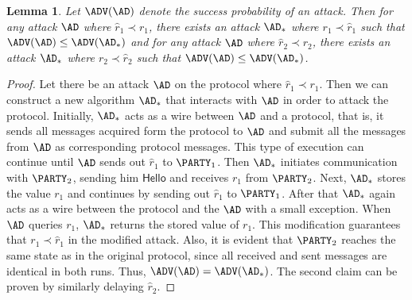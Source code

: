 \documentclass{crypto-exercise}
\newtheorem{llemma}{Lemma}
\newcommand{\HELLO}{\textsf{Hello}}
\begin{document}
\begin{solution}
\begin{llemma} Let $\ADV(\AD)$ denote the success probability of an attack. Then
    for any attack $\AD$ where $\hat{r}_1\prec r_1$, there exists an attack
    $\AD_*$ where $r_1\prec \hat{r}_1$ such that $\ADV(\AD)\leq \ADV(\AD_*)$ and
    for any attack $\AD$ where $\hat{r}_2\prec r_2$, there exists an attack
    $\AD_*$ where $r_2\prec \hat{r}_2$ such that $\ADV(\AD)\leq \ADV(\AD_*)$.
\end{llemma} 
\begin{proof} Let there be an attack $\AD$ on the protocol where
    $\hat{r}_1 \prec r_1$. Then we can construct a new algorithm $\AD_*$ that
    interacts with $\AD$ in order to attack the protocol. Initially, $\AD_*$
    acts as a wire between $\AD$ and a protocol, that is, it sends all messages
    acquired form the protocol to $\AD$ and submit all the messages from $\AD$
    as corresponding protocol messages. This type of execution can continue
    until $\AD$ sends out $\hat{r}_1$ to $\PARTY_1$. Then $\AD_*$ initiates
    communication with $\PARTY_2$, sending him $\HELLO$ and receives $r_1$ from
    $\PARTY_2$. Next, $\AD_*$ stores the value $r_1$ and continues by sending
    out $\hat{r}_1$ to $\PARTY_1$. After that $\AD_*$ again acts as a wire
    between the protocol and the $\AD$ with a small exception.  When $\AD$
    queries $r_1$, $\AD_*$ returns the stored value of $r_1$. This modification
    guarantees that $r_1\prec\hat{r}_1$ in the modified attack. Also, it is
    evident that $\PARTY_2$ reaches the same state as in the original protocol,
    since all received and sent messages are identical in both runs. Thus,
    $\ADV(\AD) = \ADV(\AD_*)$. The second claim can be proven by similarly
    delaying $\hat{r}_2$.  
\end{proof}


\end{solution}
\end{document}
